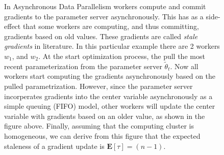 \begin{figure}[H]
  \centering
  \caption{In Asynchronous Data Parallelism workers compute and commit gradients to the parameter server asynchronously. This has as a side-effect that some workers are computing, and thus committing, gradients based on old values. These gradients are called \emph{stale gradients} in literature. In this particular example there are 2 workers $w_1$, and $w_2$. At the start optimization process, the pull the most recent parameterization from the parameter server $\tilde{\theta}_t$. Now all workers start computing the gradients asynchronously based on the pulled parametrization. However, since the parameter server incorperates gradients into the center variable asynchronously as a simple queuing (FIFO) model, other workers will update the center variable with gradients based on an older value, as shown in the figure above. Finally, assuming that the computing cluster is homogeneous, we can derive from this figure that the expected staleness of a gradient update is $\mathbf{E}[\tau] = (n - 1)$.}
  \label{fig:intro_asyn_data_parallelism}
\end{figure}

